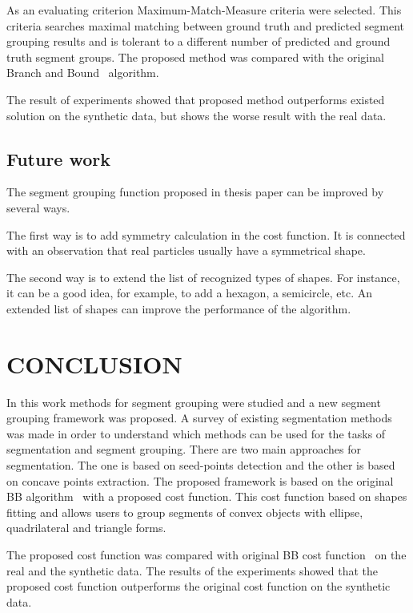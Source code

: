 \documentclass{lutmscthesis}[2010/09/22]
\begin{document}
As an evaluating criterion Maximum-Match-Measure criteria were selected.  This criteria searches maximal matching between ground truth and predicted segment grouping results and is tolerant to a different number of predicted and ground truth segment groups. The proposed method was compared with the original Branch and Bound~\cite{zafari-bb} algorithm.

The result of experiments showed that proposed method outperforms existed solution on the synthetic data, but shows the worse result with the real data.

\subsection{Future work}

The segment grouping function proposed in thesis paper can be improved by several ways.

The first way is to add symmetry calculation in the cost function. It is connected with an observation that real particles usually have a symmetrical shape. 

The second way is to extend the list of recognized types of shapes. For instance, it can be a good idea, for example, to add a hexagon, a semicircle, etc. An extended list of shapes can improve the performance of the algorithm.


\section{CONCLUSION}
\label{sec:conclusion}

In this work methods for segment grouping were studied and a new segment grouping framework was proposed. A survey of existing segmentation methods was made in order to understand which methods can be used for the tasks of segmentation and segment grouping. There are two main approaches for segmentation. The one is based on seed-points detection and the other is based on concave points extraction. The proposed framework is based on the original BB algorithm~\cite{zafari-bb} with a proposed cost function. This cost function based on shapes fitting and allows users to group segments of convex objects with ellipse, quadrilateral and triangle forms. 

The proposed cost function was compared with original BB cost function~\cite{zafari-bb} on the real and the synthetic data. The results of the experiments showed that the proposed cost function outperforms the original cost function on the synthetic data.
\end{document}

